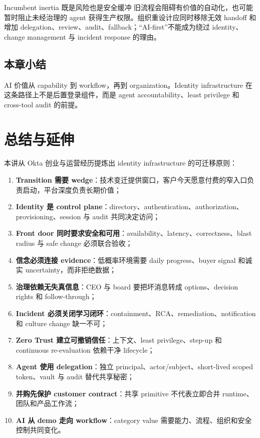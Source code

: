 \documentclass[a4paper]{article}
\begin{document}
\begin{warningbox}{Incumbent inertia 既是风险也是安全缓冲}
旧流程会阻碍有价值的自动化，也可能暂时阻止未经治理的 agent 获得生产权限。组织重设计应同时移除无效 handoff 和增加 delegation、review、audit、fallback；“AI-first”不能成为绕过 identity、change management 与 incident response 的理由。
\end{warningbox}

\subsection{本章小结}

AI 价值从 capability 到 workflow，再到 organization。Identity infrastructure 在这条路径上不是后置登录组件，而是 agent accountability、least privilege 和 cross-tool audit 的前提。

\section{总结与延伸}

本讲从 Okta 创业与运营经历提炼出 identity infrastructure 的可迁移原则：

\begin{enumerate}
  \item \textbf{Transition 需要 wedge}：技术变迁提供窗口，客户今天愿意付费的窄入口负责启动，平台深度负责长期价值；
  \item \textbf{Identity 是 control plane}：directory、authentication、authorization、provisioning、session 与 audit 共同决定访问；
  \item \textbf{Front door 同时要求安全和可用}：availability、latency、correctness、blast radius 与 safe change 必须联合验收；
  \item \textbf{信念必须连接 evidence}：低概率环境需要 daily progress、buyer signal 和诚实 uncertainty，而非拒绝数据；
  \item \textbf{治理依赖无失真信息}：CEO 与 board 要把坏消息转成 options、decision rights 和 follow-through；
  \item \textbf{Incident 必须关闭学习闭环}：containment、RCA、remediation、notification 和 culture change 缺一不可；
  \item \textbf{Zero Trust 建立可撤销信任}：上下文、least privilege、step-up 和 continuous re-evaluation 依赖干净 lifecycle；
  \item \textbf{Agent 使用 delegation}：独立 principal、actor/subject、short-lived scoped token、vault 与 audit 替代共享秘密；
  \item \textbf{并购先保护 customer contract}：共享 primitive 不代表立即合并 runtime、团队和产品工作流；
  \item \textbf{AI 从 demo 走向 workflow}：category value 需要能力、流程、组织和安全控制共同变化。
\end{enumerate}
\end{document}
